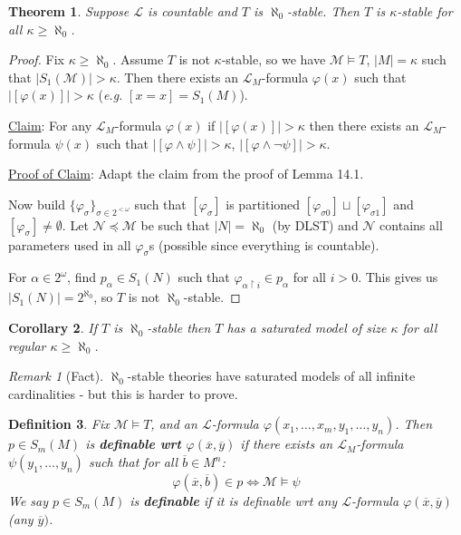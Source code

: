 \documentclass[]{article}
\theoremstyle{custhm}
\newtheorem{theorem}{Theorem}[section]
\theoremstyle{cusdef}
\newtheorem{defin}[theorem]{Definition}
\theoremstyle{custhm}
\theoremstyle{custhm}
\newtheorem{cor}[theorem]{Corollary}
\theoremstyle{custhm}
\theoremstyle{ex}
\theoremstyle{custhm}
\theoremstyle{cusdef}
\theoremstyle{remark}
\newtheorem*{remark*}{Remark}
\theoremstyle{remark}
\theoremstyle{numremark}
\newcommand{\undf}[1]{\textit{\textbf{#1}}}
\renewcommand{\L}{\mathcal{L}}
\renewcommand{\it}[1]{\textit{#1}}
\newcommand{\M}{\mathcal{M}}
\renewcommand{\phi}{\varphi}
\renewcommand{\bar}{\overline}
\newcommand{\N}{\mathcal{N}}
\begin{document}
\begin{theorem}
	Suppose $\L$ is countable and $T$ is $\aleph_0$-stable. Then $T$ is $\kappa$-stable for all $\kappa\ge \aleph_0$.
\end{theorem}
\begin{proof}
	Fix $\kappa \ge \aleph_0$. Assume $T$ is not $\kappa$-stable, so we have $\M\models T$, $|M| = \kappa$ such that $|S_1(\M)| > \kappa$. Then there exists an $\L_M$-formula $\phi(x)$ such that $|[\phi(x)]|>\kappa$ (\it{e.g.} $[x=x]=S_1(M)$).

	\underline{Claim}: For any $\L_M$-formula $\phi(x)$ if $|[\phi(x)]| > \kappa$ then there exists an $\L_M$-formula $\psi(x)$ such that $|[\phi \land \psi]| > \kappa$, $|[\phi \land \neg \psi]| > \kappa$.

	\underline{Proof of Claim}: Adapt the claim from the proof of Lemma 14.1.

	Now build $\{\phi_\sigma\}_{\sigma\in 2^{<\omega}}$ such that $[\phi_\sigma]$ is partitioned $[\phi_{\sigma 0}]\sqcup [\phi_{\sigma 1}] $ and $[\phi_\sigma]\ne \emptyset$. Let $\N\preceq \M$ be such that $|N| = \aleph_0$ (by DLST) and $\N$ contains all parameters used in all $\phi_\sigma$s (possible since everything is countable).

	For $\alpha \in 2^\omega$, find $p_\alpha\in S_1(N)$ such that $\phi_{\alpha \upharpoonright i}\in p_\alpha$ for all $i > 0$. This gives us $|S_1(N)| = 2^{\aleph_0}$, so $T$ is not $\aleph_0$-stable.
\end{proof}

\begin{cor}
	If $T$ is $\aleph_0$-stable then $T$ has a saturated model of size $\kappa$ for all regular $\kappa \ge \aleph_0$.
\end{cor}

\begin{remark*}[Fact]
	$\aleph_0$-stable theories have saturated models of all infinite cardinalities - but this is harder to prove.
\end{remark*}

\begin{defin}
	Fix $\M\models T$, and an $\L$-formula $\phi(x_1,\dots,x_m,y_1,\dots,y_n)$. Then $p \in S_m(M)$ is \undf{definable wrt $\phi(\bar{x},\bar{y})$} if there exists an $\L_M$-formula $\psi(y_1,\dots,y_n)$ such that for all $\bar{b}\in M^n$: $$\phi(\bar{x},\bar{b})\in p \iff \M\models \psi$$
	We say $p \in S_m(M)$ is \undf{definable} if it is definable wrt any $\L$-formula $\phi(\bar{x},\bar{y})$ (any $\bar{y})$.
\end{defin}
\end{document}
